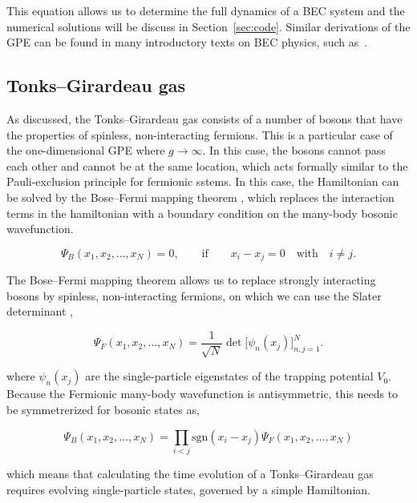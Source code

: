 This equation allows us to determine the full dynamics of a BEC system and the numerical solutions will be discuss in Section~\ref{sec:code}. Similar derivations of the GPE can be found in many introductory texts on BEC physics, such as~\cite{Fetter2003,  Pethick2002, Fetter2009}.

\subsection{Tonks--Girardeau gas}

As discussed, the Tonks--Girardeau gas consists of a number of bosons that have the properties of spinless, non-interacting fermions.
This is a particular case of the one-dimensional GPE where $g\rightarrow\infty$.
In this case, the bosons cannot pass each other and cannot be at the same location, which acts formally similar to the Pauli-exclusion principle for fermionic sstems.
In this case, the Hamiltonian can be solved by the Bose--Fermi mapping theorem \cite{girardeau2001ground, girardeau2001measurement}, which replaces the interaction terms in the hamiltonian with a boundary condition on the many-body bosonic wavefunction.

\begin{equation}
\Psi_B(x_1, x_2, \ldots, x_N) = 0,\qquad \mathrm{if}\qquad x_i - x_j = 0 \quad\textrm{with}\quad i \ne j.
\end{equation}

The Bose--Fermi mapping theorem allows us to replace strongly interacting bosons by spinless, non-interacting fermions, on which we can use the Slater determinant ,

\begin{equation}
\Psi_F (x_1, x_2, \ldots, x_N) = \frac{1}{\sqrt{N}} \det\Big[\psi_n(x_j)\Big]_{n,j=1}^N.
\end{equation}

\noindent where $\psi_n(x_j)$ are the single-particle eigenstates of the trapping potential $V_0$.
Because the Fermionic many-body wavefunction is antisymmetric, this needs to be symmetrerized for bosonic states as, 

\begin{equation}
\Psi_B(x_1, x_2, \ldots, x_N) =
\prod_{i < j}
\mathrm{sgn}(x_i - x_j)\Psi_F(x_1, x_2, \ldots, x_N)
\end{equation}

\noindent which means that calculating the time evolution of a Tonks--Girardeau gas requires evolving single-particle states, governed by a simple Hamiltonian.
